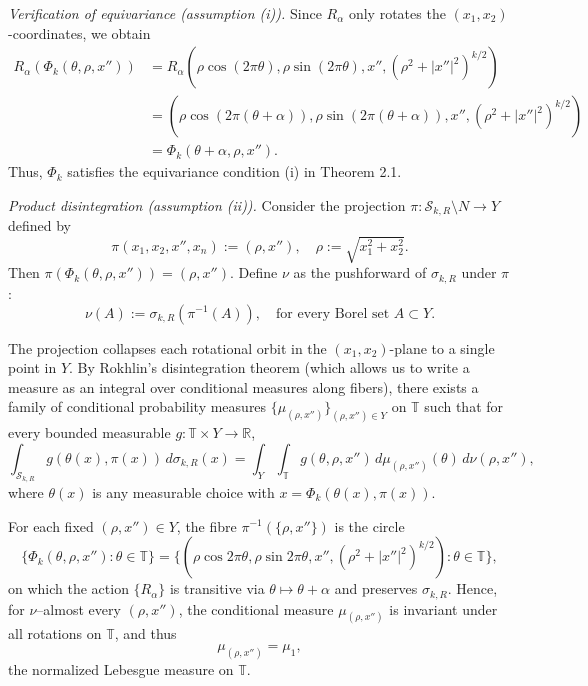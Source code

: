 \documentclass[11pt]{article}
\numberwithin{equation}{section}
\theoremstyle{remark}
\begin{document}
\emph{Verification of equivariance (assumption (i)).} Since $R_\alpha$ only rotates the $(x_1, x_2)$-coordinates, we obtain
\begin{align*}
R_\alpha(\Phi_k(\theta, \rho, x'')) &= R_\alpha\left(\rho \cos(2\pi\theta), \rho \sin(2\pi\theta), x'', (\rho^2 + |x''|^2)^{k/2}\right) \\
&= \left(\rho \cos(2\pi(\theta+\alpha)), \rho \sin(2\pi(\theta+\alpha)), x'', (\rho^2 + |x''|^2)^{k/2}\right) \\
&= \Phi_k(\theta+\alpha, \rho, x'').
\end{align*}
Thus, $\Phi_k$ satisfies the equivariance condition (i) in Theorem 2.1.

\emph{Product disintegration (assumption (ii)).} Consider the projection $\pi : \mathcal{S}_{k,R} \setminus N \rightarrow Y$ defined by
\[ \pi(x_1, x_2, x'', x_n) := (\rho, x''), \quad \rho := \sqrt{x_1^2+x_2^2}. \]
Then $\pi(\Phi_k(\theta, \rho, x'')) = (\rho, x'')$. Define $\nu$ as the pushforward of $\sigma_{k,R}$ under $\pi$:
\begin{equation}\label{definition:measure-nu-paraboloid}
\nu(A) := \sigma_{k,R}(\pi^{-1}(A)), \quad \text{for every Borel set } A \subset Y.
\end{equation}

The projection collapses each rotational orbit in the $(x_1, x_2)$-plane to a single point in $Y$. By Rokhlin's disintegration theorem (which allows us to write a measure as an integral over conditional measures along fibers), there exists a family of conditional probability measures $\{\mu_{(\rho, x'')}\}_{(\rho, x'') \in Y}$ on $\mathbb{T}$ such that for every bounded measurable $g : \mathbb{T} \times Y \rightarrow \mathbb{R}$,
\[ \int_{\mathcal{S}_{k,R}} g(\theta(x), \pi(x)) \, d\sigma_{k,R}(x) = \int_Y \int_{\mathbb{T}} g(\theta, \rho, x'') \, d\mu_{(\rho, x'')}(\theta) \, d\nu(\rho, x''), \]
where $\theta(x)$ is any measurable choice with $x = \Phi_k(\theta(x), \pi(x))$.

For each fixed $(\rho,x'')\in Y$, the fibre $\pi^{-1}(\{\rho,x''\})$ is
the circle
\[
\big\{\Phi_k(\theta,\rho,x'') : \theta\in \mathbb{T}\big\}
 = \big\{(\rho\cos 2\pi\theta,\rho\sin 2\pi\theta,
          x'',(\rho^2+|x''|^2)^{k/2}) : \theta\in \mathbb{T}\big\},
\]
on which the action $\{R_\alpha\}$ is transitive via
$\theta\mapsto\theta+\alpha$ and preserves $\sigma_{k,R}$. Hence, for $\nu$–almost every $(\rho,x'')$, the conditional measure $\mu_{(\rho,x'')}$ is invariant under all rotations on $\mathbb{T}$, and thus
\[
\mu_{(\rho,x'')} = \mu_1,
\]
the normalized Lebesgue measure on $\mathbb{T}$.
\end{document}
